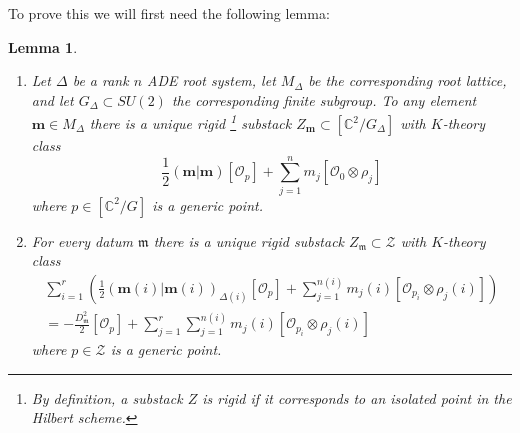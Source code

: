 \documentclass{amsart}
\newtheorem{lemma}[theorem]{Lemma}
\theoremstyle{definition}
\newcommand{\half}{\frac{1}{2}}
\newcommand{\mdata}{\mathfrak{m}}
\renewcommand{\O}{\mathcal{O}}
\newcommand{\Zcal}{\mathcal{Z}}
\newcommand{\mvec}{\bm{m}}
\begin{document}
To prove this we will first need the following lemma:

\begin{lemma}
\label{lem:rigidsh} $\quad$

	\begin{enumerate} \item Let $\Delta$ be a rank $n$ ADE root
system, let $M_{\Delta }$ be the corresponding root lattice, and let
$G_{\Delta } \subset SU(2)$ the corresponding finite subgroup. To any
element $\mvec \in M_{\Delta }$ there is a unique rigid
\footnote{By
definition, a substack $Z$ is \emph{rigid} if it corresponds to an
isolated point in the Hilbert scheme. }
substack $Z_{\mvec}\subset [\mathbb{C}^2/G_{\Delta}]$ with $K$-theory
class
\[
\half (\mvec|\mvec)[\O_{p}] + \sum_{j=1}^{n}
m_{j}[\O_{0}\otimes \rho_{j}]
\]
where $p \in [\mathbb{C}^2/G]$ is a generic point.
	
		\item For every datum $\mdata$ there is a unique rigid
substack $Z_{\mdata} \subset \mathcal{Z}$ with $K$-theory
class \begin{gather*}\sum_{i=1}^r
\left(
\frac{1}{2}(\mvec(i)|\mvec(i))_{\Delta (i)}[\O_{p}] + \sum_{j=1}^{n(i)}
m_{j}(i)[\O_{p_i}\otimes \rho_{j}(i)]
 \right)\\
=-\frac{
D_{\mdata}^{2}}{2}[\O_{p}] +\sum_{j=1}^{r} \sum_{j=1}^{n(i)} m_{j}(i)[\O_{p_i}\otimes
\rho_{j}(i)] \end{gather*} where $p \in \Zcal$ is a generic point.
	\end{enumerate}
\end{lemma}
\end{document}
